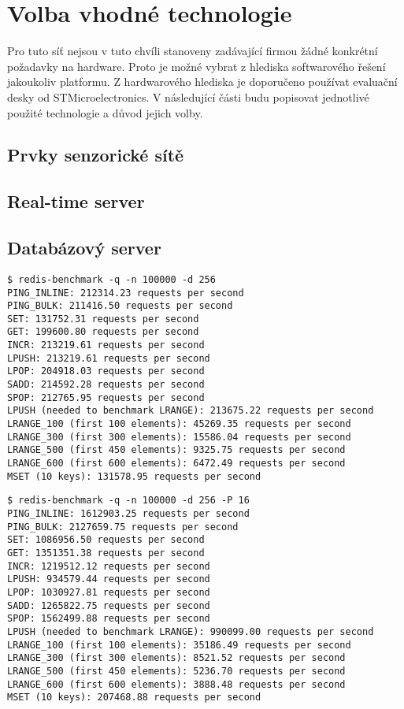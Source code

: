 \chapter{Volba vhodné technologie}
Pro tuto síť nejsou v tuto chvíli stanoveny zadávající firmou žádné konkrétní požadavky na hardware. Proto je možné vybrat z hlediska softwarového řešení jakoukoliv platformu. Z hardwarového hlediska je doporučeno používat evaluační desky od STMicroelectronics. V následující části budu popisovat jednotlivé použité technologie a důvod jejich volby.

\section{Prvky senzorické sítě}


\section{Real-time server}


\section{Databázový server}
\cite{redis-benchmark}

\begin{verbatim}
$ redis-benchmark -q -n 100000 -d 256
PING_INLINE: 212314.23 requests per second
PING_BULK: 211416.50 requests per second
SET: 131752.31 requests per second
GET: 199600.80 requests per second
INCR: 213219.61 requests per second
LPUSH: 213219.61 requests per second
LPOP: 204918.03 requests per second
SADD: 214592.28 requests per second
SPOP: 212765.95 requests per second
LPUSH (needed to benchmark LRANGE): 213675.22 requests per second
LRANGE_100 (first 100 elements): 45269.35 requests per second
LRANGE_300 (first 300 elements): 15586.04 requests per second
LRANGE_500 (first 450 elements): 9325.75 requests per second
LRANGE_600 (first 600 elements): 6472.49 requests per second
MSET (10 keys): 131578.95 requests per second
\end{verbatim}

\begin{verbatim}
$ redis-benchmark -q -n 100000 -d 256 -P 16
PING_INLINE: 1612903.25 requests per second
PING_BULK: 2127659.75 requests per second
SET: 1086956.50 requests per second
GET: 1351351.38 requests per second
INCR: 1219512.12 requests per second
LPUSH: 934579.44 requests per second
LPOP: 1030927.81 requests per second
SADD: 1265822.75 requests per second
SPOP: 1562499.88 requests per second
LPUSH (needed to benchmark LRANGE): 990099.00 requests per second
LRANGE_100 (first 100 elements): 35186.49 requests per second
LRANGE_300 (first 300 elements): 8521.52 requests per second
LRANGE_500 (first 450 elements): 5236.70 requests per second
LRANGE_600 (first 600 elements): 3888.48 requests per second
MSET (10 keys): 207468.88 requests per second
\end{verbatim}

